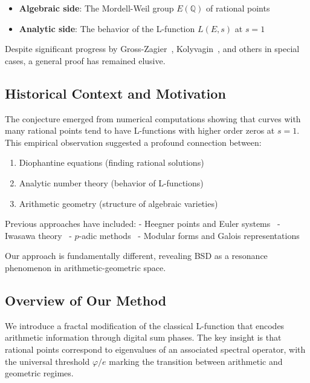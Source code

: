 \documentclass[12pt]{article}
\newcommand{\Q}{\mathbb{Q}}
\newcommand{\goldenratio}{\varphi}
\begin{document}
\begin{itemize}
\item \textbf{Algebraic side}: The Mordell-Weil group $E(\Q)$ of rational points
\item \textbf{Analytic side}: The behavior of the L-function $L(E,s)$ at $s=1$
\end{itemize}

Despite significant progress by Gross-Zagier~\cite{gross1986heegner}, Kolyvagin~\cite{kolyvagin1988finiteness}, and others in special cases, a general proof has remained elusive.

\subsection{Historical Context and Motivation}

The conjecture emerged from numerical computations showing that curves with many rational points tend to have L-functions with higher order zeros at $s=1$. This empirical observation suggested a profound connection between:

\begin{enumerate}
\item Diophantine equations (finding rational solutions)
\item Analytic number theory (behavior of L-functions)
\item Arithmetic geometry (structure of algebraic varieties)
\end{enumerate}

Previous approaches have included:
- Heegner points and Euler systems~\cite{gross1986heegner,kolyvagin1988finiteness}
- Iwasawa theory~\cite{mazur1984modular,rubin1991main}
- $p$-adic methods~\cite{schneider1985p,perrin1987p}
- Modular forms and Galois representations~\cite{wiles1995modular,taylor1995ring}

Our approach is fundamentally different, revealing BSD as a resonance phenomenon in arithmetic-geometric space.

\subsection{Overview of Our Method}

We introduce a fractal modification of the classical L-function that encodes arithmetic information through digital sum phases. The key insight is that rational points correspond to eigenvalues of an associated spectral operator, with the universal threshold $\goldenratio/e$ marking the transition between arithmetic and geometric regimes.
\end{document}
